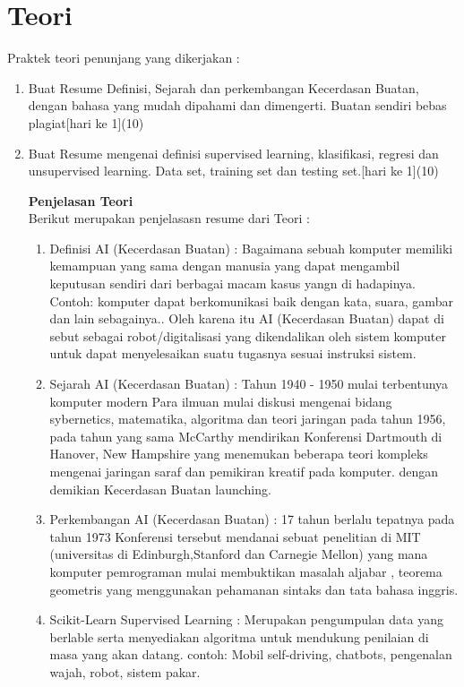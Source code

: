 \section{Teori}
Praktek teori penunjang yang dikerjakan :
\begin{enumerate}
\item
Buat Resume Definisi, Sejarah dan perkembangan Kecerdasan Buatan, dengan bahasa yang mudah dipahami dan dimengerti. Buatan sendiri bebas plagiat[hari ke 1](10)
\item
Buat Resume mengenai definisi supervised learning, klasifikasi, regresi dan unsupervised learning. Data set, training set dan testing set.[hari ke 1](10)

\textbf{Penjelasan Teori}
          \\Berikut merupakan penjelasasn resume dari Teori :
          \begin{enumerate}
              \item Definisi AI (Kecerdasan Buatan) : Bagaimana sebuah komputer memiliki kemampuan yang sama dengan manusia yang dapat mengambil keputusan sendiri dari berbagai macam kasus yangn di hadapinya. Contoh: komputer dapat berkomunikasi baik dengan kata, suara, gambar dan lain sebagainya.. Oleh karena itu AI (Kecerdasan Buatan) dapat di sebut sebagai robot/digitalisasi yang dikendalikan oleh sistem komputer untuk dapat menyelesaikan suatu tugasnya sesuai instruksi sistem.

              \item Sejarah AI (Kecerdasan Buatan) : Tahun 1940 - 1950 mulai terbentunya komputer modern Para ilmuan mulai diskusi mengenai bidang sybernetics, matematika, algoritma dan teori jaringan pada tahun 1956, pada tahun yang sama McCarthy mendirikan Konferensi Dartmouth di Hanover, New Hampshire yang menemukan beberapa teori kompleks mengenai jaringan saraf dan pemikiran kreatif pada komputer. dengan demikian Kecerdasan Buatan launching.

              \item Perkembangan AI (Kecerdasan Buatan) : 17 tahun berlalu tepatnya pada tahun 1973 Konferensi tersebut mendanai sebuat penelitian di MIT (universitas di Edinburgh,Stanford dan Carnegie Mellon) yang mana komputer pemrograman mulai membuktikan masalah aljabar , teorema geometris yang menggunakan pehamanan sintaks dan tata bahasa inggris.

              \item Scikit-Learn Supervised Learning : Merupakan pengumpulan data yang berlable serta menyediakan algoritma untuk mendukung penilaian di masa yang akan datang. contoh: Mobil self-driving, chatbots, pengenalan wajah, robot, sistem pakar.


\end{enumerate}
\end{enumerate}
